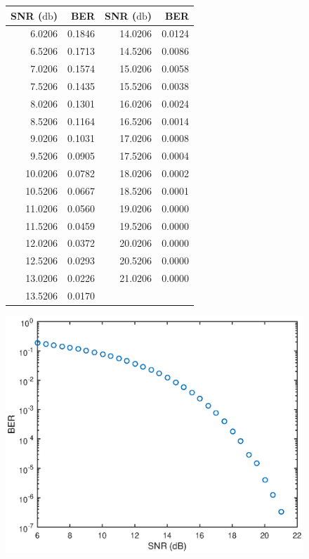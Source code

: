 \documentclass{article}
\begin{document}
\begin{figure}[H]
	\hspace{-1.5cm}
	\begin{minipage}{6cm}
		\begin{tabular}{rrrr}
			\toprule
			\textbf{SNR} ($\si{\decibel}$) & \textbf{BER} & \textbf{SNR} ($\si{\decibel}$) & \textbf{BER}\\
			\midrule
			6.0206&    0.1846 	& 	14.0206 	&    0.0124\\
			6.5206&    0.1713	& 	14.5206 	&    0.0086\\
			7.0206&    0.1574	& 	15.0206		&    0.0058\\
			7.5206&    0.1435	& 	15.5206		&    0.0038\\
			8.0206&    0.1301	&	16.0206		&    0.0024\\
			8.5206&    0.1164	&	16.5206		&    0.0014\\
			9.0206&    0.1031	&	17.0206		&    0.0008\\
			9.5206&    0.0905	&	17.5206		&    0.0004\\
			10.0206&    0.0782	&	18.0206		&    0.0002\\
			10.5206&    0.0667	&	18.5206		&    0.0001\\
			11.0206&    0.0560	&	19.0206		&    0.0000\\
			11.5206&    0.0459	&	19.5206		&    0.0000\\
			12.0206&    0.0372	&	20.0206		&    0.0000\\
			12.5206&    0.0293	&	20.5206		&    0.0000\\
			13.0206&    0.0226	&	21.0206		&    0.0000\\
			13.5206&    0.0170 & &\\
			\bottomrule
		\end{tabular}
	\end{minipage}
	\hspace{2cm}
	\begin{minipage}{6cm}
		\includegraphics[scale=0.5]{fig1}

\end{minipage}
\end{figure}
\end{document}
